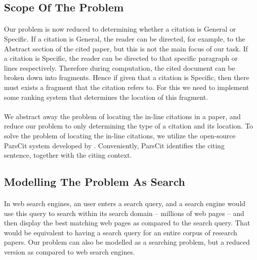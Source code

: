 \subsection{Scope Of The Problem}
\paragraph{}
Our problem is now reduced to determining whether a citation is General or Specific. If a citation is General, the reader can be directed, for example, to the Abstract section of the cited paper, but this is not the main focus of our task. If a citation is Specific, the reader can be directed to that specific paragraph or lines respectively. Therefore during computation, the cited document can be broken down into fragments. Hence if given that a citation is Specific, then there must exists a fragment that the citation refers to. For this we need to implement some ranking system that determines the location of this fragment.

\paragraph{}
We abstract away the problem of locating the in-line citations in a paper, and reduce our problem to only determining the type of a citation and its location. To solve the problem of locating the in-line citations, we utilize the open-source ParsCit system developed by \cite{parscit}. Conveniently, ParsCit identifies the citing sentence, together with the citing context.

\subsection{Modelling The Problem As Search}
\paragraph{}
In web search engines, an user enters a search query, and a search engine would use this query to search within its search domain -- millions of web pages -- and then display the best matching web pages as compared to the search query. That would be equivalent to having a search query for an entire corpus of research papers. Our problem can also be modelled as a searching problem, but a reduced version as compared to web search engines.

